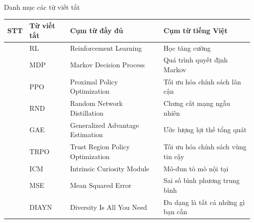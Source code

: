 \documentclass{uetgraduation}
\begin{document}
\begin{contentlisting}

\tableofcontents %
\listoffigures %
\listoftables %

\begin{contentlistingsection}{Danh mục các từ viết tắt}

\begin{center}
\renewcommand{\arraystretch}{1.3}
\setlength{\tabcolsep}{8pt}

\begin{tabular}{|
    >{\centering\arraybackslash}m{1cm}
    |>{\centering\arraybackslash}m{2.5cm}
    |>{\raggedright\arraybackslash}m{5cm}
    |>{\raggedright\arraybackslash}m{5cm}|
}
\hline
\textbf{STT} & \textbf{Từ viết tắt} & \textbf{Cụm từ đầy đủ} & \textbf{Cụm từ tiếng Việt} \\
\hline
1 & RL   & Reinforcement Learning & Học tăng cường \\
\hline
2 & MDP  & Markov Decision Process & Quá trình quyết định Markov \\
\hline
3 & PPO  & Proximal Policy Optimization & Tối ưu hóa chính sách lân cận \\
\hline
4 & RND  & Random Network Distillation & Chưng cất mạng ngẫu nhiên \\
\hline
5 & GAE  & Generalized Advantage Estimation & Ước lượng lợi thế tổng quát \\
\hline
6 & TRPO & Trust Region Policy Optimization & Tối ưu hóa chính sách vùng tin cậy \\
\hline
7 & ICM  & Intrinsic Curiosity Module & Mô-đun tò mò nội tại \\
\hline
8 & MSE  & Mean Squared Error & Sai số bình phương trung bình \\
\hline
9 & DIAYN & Diversity Is All You Need & Đa dạng là tất cả những gì bạn cần \\
\hline
\end{tabular}
\end{center}

\end{contentlistingsection}

\end{contentlisting}

\end{document}
